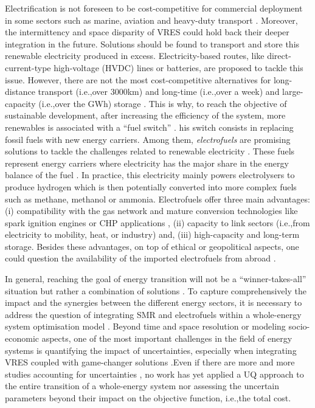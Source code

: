 \documentclass[11pt,twoside,a4paper,english]{article}
\def\ie{i.e.,}
\begin{document}
Electrification is not foreseen to be cost-competitive for commercial deployment in some sectors such as marine, aviation and heavy-duty transport \cite{horvath2018techno, brynolf2018,IEA2021,kersey2022rapid,stolz2022techno}. Moreover, the intermittency and space disparity of \gls{VRES} could hold back their deeper integration in the future. Solutions should be found to transport and store this renewable electricity produced in excess. Electricity-based routes, like direct-current-type high-voltage (HVDC) lines \cite{guo2022implications} or batteries, are proposed to tackle this issue. However, there are not the most cost-competitive alternatives for long-distance transport (\ie over 3000km) and long-time (\ie over a week) and large-capacity (\ie over the GWh) storage \cite{ISPT2017,dias2020energy}. This is why, to reach the objective of sustainable development, after increasing the efficiency of the system, more renewables is associated with a ``fuel switch'' \cite{millinger2021electrofuels}. his switch consists in replacing fossil fuels with new energy carriers.  Among them, \textit{electrofuels} are promising solutions to tackle the challenges related to renewable electricity \cite{rozzi2020}. These fuels represent energy carriers where electricity has the major share in the energy balance of the fuel \cite{rixhon2021terminology}. In practice, this electricity mainly powers electrolysers to produce hydrogen which is then potentially converted into more complex fuels such as methane, methanol or ammonia.  Electrofuels offer three main advantages: (i) compatibility with the gas network and mature conversion technologies like spark ignition engines \cite{lhuillier2020experimental} or \gls{CHP} applications \cite{pochet202022}, (ii) capacity to link sectors (\ie from electricity to mobility, heat, or industry) \cite{Stancin2020} and,  (iii) high-capacity and long-term storage.  Besides these advantages, on top of ethical or geopolitical aspects, one could question the availability of the imported electrofuels from abroad \cite{odenweller2025green}.

In general, reaching the goal of energy transition will not be a ``winner-takes-all'' situation but rather a combination of solutions \cite{Limpens2020,pickering2022diversity}. To capture comprehensively the impact and the synergies between the different energy sectors, it is necessary to address the question of integrating \gls{SMR} and electrofuels within a whole-energy system optimisation model \cite{contino2020whole}. Beyond time and space resolution or modeling socio-economic aspects, one of the most important challenges in the field of energy systems is quantifying the impact of uncertainties, especially when integrating \gls{VRES} coupled with game-changer solutions \cite{pfenninger2014energy,fodstad2022next,manco2024review}.Even if there are more and more studies accounting for uncertainties \cite{yue2018review}, no work has yet applied a \gls{UQ} approach to the entire transition of a whole-energy system nor assessing the uncertain parameters beyond their impact on the objective function, \ie the total cost.
\end{document}
